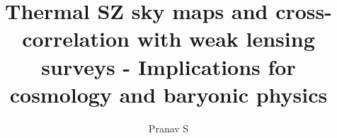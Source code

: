 

\newcommand{\comment}[1]{\textbf{\color{red}{#1}}}
\title{Thermal SZ sky maps and cross-correlation with weak lensing surveys - Implications for cosmology and baryonic physics}

\author{Pranav S \comment{Do all the thesis fancy things}\\\comment{ like university logo, filfilment dialogue and supervisor}}
\maketitle


\tableofcontents









